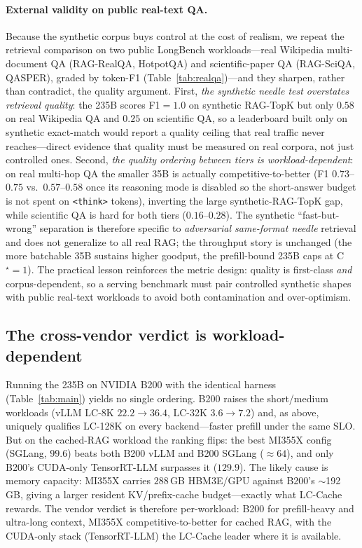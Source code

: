 \paragraph{External validity on public real-text QA.}
Because the synthetic corpus buys control at the cost of realism, we repeat the
retrieval comparison on two public LongBench workloads---real Wikipedia
multi-document QA (RAG-RealQA, HotpotQA) and scientific-paper QA (RAG-SciQA,
QASPER), graded by token-F1 (Table~\ref{tab:realqa})---and they sharpen, rather than
contradict, the quality argument. First, \emph{the synthetic needle test overstates
retrieval quality}: the 235B scores F1$=1.0$ on synthetic RAG-TopK but only $0.58$
on real Wikipedia QA and $0.25$ on scientific QA, so a leaderboard built only on
synthetic exact-match would report a quality ceiling that real traffic never
reaches---direct evidence that quality must be measured on real corpora, not just
controlled ones. Second, \emph{the quality ordering between tiers is
workload-dependent}: on real multi-hop QA the smaller 35B is actually
competitive-to-better (F1 $0.73$--$0.75$ vs.\ $0.57$--$0.58$ once its reasoning mode
is disabled so the short-answer budget is not spent on \texttt{<think>} tokens),
inverting the large synthetic-RAG-TopK gap, while scientific QA is hard for both
tiers ($0.16$--$0.28$). The synthetic ``fast-but-wrong'' separation is therefore
specific to \emph{adversarial same-format needle} retrieval and does not
generalize to all real RAG; the throughput story is unchanged (the more batchable
35B sustains higher goodput, the prefill-bound 235B caps at C$^\star{=}1$). The
practical lesson reinforces the metric design: quality is first-class \emph{and}
corpus-dependent, so a serving benchmark must pair controlled synthetic shapes with
public real-text workloads to avoid both contamination and over-optimism.

\subsection{The cross-vendor verdict is workload-dependent}
\label{subsec:insight-crossvendor}
Running the 235B on NVIDIA B200 with the identical harness
(Table~\ref{tab:main}) yields no single ordering. B200 raises the short/medium
workloads (vLLM LC-8K $22.2\!\to\!36.4$, LC-32K $3.6\!\to\!7.2$) and, as above,
uniquely qualifies LC-128K on every backend---faster prefill under the same SLO.
But on the cached-RAG workload the ranking flips: the best MI355X config (SGLang,
$99.6$) beats both B200 vLLM and B200 SGLang ($\approx64$), and only B200's
CUDA-only TensorRT-LLM surpasses it ($129.9$). The likely cause is memory capacity:
MI355X carries $288$\,GB HBM3E/GPU against B200's $\sim$192\,GB, giving a larger
resident KV/prefix-cache budget---exactly what LC-Cache rewards. The vendor verdict
is therefore per-workload: B200 for prefill-heavy and ultra-long context, MI355X
competitive-to-better for cached RAG, with the CUDA-only stack (TensorRT-LLM) the
LC-Cache leader where it is available.

